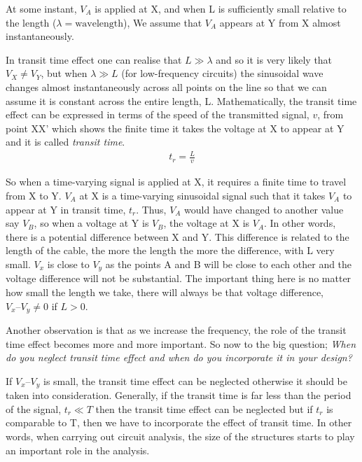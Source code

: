 At some instant, $ V_{A} $ is applied at X, and when L is sufficiently small relative to the length ($  \lambda = \text{wavelength} $), We assume that $ V_{A} $ appears at Y from X almost instantaneously.

In transit time effect one can realise that $ L \gg\lambda$ and so it is very likely that $ V_{X} \neq V_{Y} $, but when $  \lambda \gg L  $ (for low-frequency circuits) the sinusoidal wave changes almost instantaneously across all points on the line so that we can assume it is constant across the entire length, L. Mathematically, the transit time effect can be expressed in terms of the speed of the transmitted signal, $v$, from point XX' which shows the finite time it takes the voltage at X to appear at Y and it is called \textit{transit time}.
\begin{align}
t_{r} = \frac{L}{v}
\label{eqn:transittime}
\end{align}

So when a time-varying signal is applied at X, it requires a finite time to travel from X to Y. $ V_{A} $ at X is a time-varying sinusoidal signal such that it takes $ V_{A} $ to appear at Y in transit time, $t_r$. Thus, $ V_{A} $ would have changed to another value say $ V_{B} $, so when a voltage at Y is $ V_{B} $, the voltage at X is $ V_{A} $. In other words, there is a potential difference between X and Y. This difference is related to the length of the cable, the more the length the more the difference, with L very small. $ V_{x} $ is close to $ V_{y} $ as the points A and B will be close to each other and the voltage difference will not be substantial. The important thing here is no matter how small the length we take, there will always be that voltage difference, $ V_{x} – V_{y} \neq 0 $ if $ L > 0 $.

Another observation is that as we increase the frequency, the role of the transit time effect becomes more and more important. So now to the big question; \textit{When do you neglect transit time effect and when do you incorporate it in your design?}


If $ V_{x} – V_{y} $ is small, the transit time effect can be neglected otherwise it should be taken into consideration. Generally, if the transit time is far less than the period of the signal,  $ t_{r} \ll T $ then the  transit time effect can be neglected but if $ t_{r} $ is comparable to T, then we have to incorporate the effect of transit time. In other words, when carrying out circuit analysis, the size of the structures starts to play an important role in the analysis.

